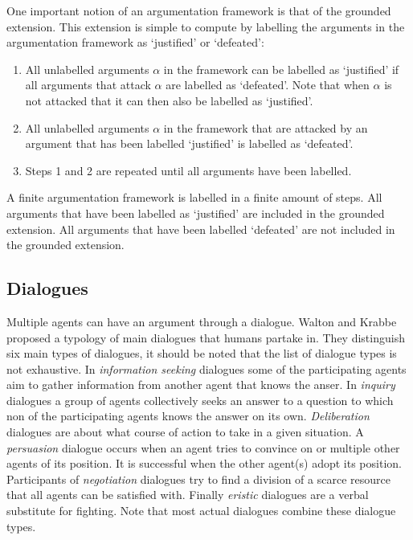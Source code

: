 \documentclass[a4paper]{article}
\begin{document}
One important notion of an argumentation framework is that of the grounded
extension. This extension is simple to compute by labelling the arguments in
the argumentation framework as `justified' or `defeated':
\begin{enumerate}
	\item All unlabelled arguments $\alpha$ in the framework can be labelled as
	`justified' if all arguments that attack $\alpha$ are labelled as
	`defeated'. Note that when $\alpha$ is not attacked that it can then also
	be labelled as `justified'.
	\item All unlabelled arguments $\alpha$ in the framework that are attacked
	by an argument that has been labelled `justified' is labelled as `defeated'.
	\item Steps 1 and 2 are repeated until all arguments have been labelled.
\end{enumerate}
A finite argumentation framework is labelled in a finite amount of steps. All
arguments that have been labelled as `justified' are included in the grounded
extension. All arguments that have been labelled `defeated' are not included in
the grounded extension.

\subsection{Dialogues}
Multiple agents can have an argument through a dialogue. Walton and
Krabbe \cite{walton1995} proposed a typology of main dialogues that humans
partake in. They distinguish six main types of dialogues, it should be noted
that the list of dialogue types is not exhaustive. In \emph{information
seeking} dialogues some of the participating agents aim to gather information
from another agent that knows the anser. In \emph{inquiry} dialogues a group of
agents collectively seeks an answer to a question to which non of the
participating agents knows the answer on its own. \emph{Deliberation} dialogues
are about what course of action to take in a given situation. A
\emph{persuasion} dialogue occurs when an agent tries to convince on or
multiple other agents of its position. It is successful when the other agent(s)
adopt its position. Participants of \emph{negotiation} dialogues try to find a
division of a scarce resource that all agents can be satisfied with. Finally
\emph{eristic} dialogues are a verbal substitute for fighting. Note that most
actual dialogues combine these dialogue types.
\end{document}

